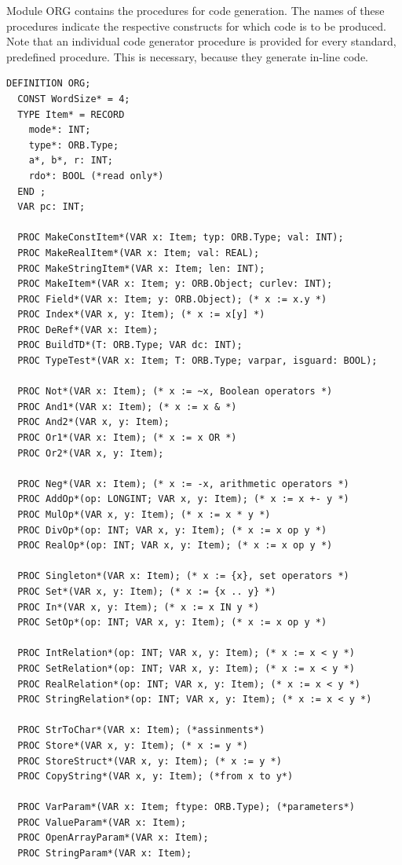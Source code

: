 Module ORG contains the procedures for code generation. The names of these procedures indicate
the respective constructs for which code is to be produced. Note that an individual code generator
procedure is provided for every standard, predefined procedure. This is necessary, because they
generate in-line code.
\begin{verbatim}
DEFINITION ORG;
  CONST WordSize* = 4;
  TYPE Item* = RECORD
    mode*: INT;
    type*: ORB.Type;
    a*, b*, r: INT;
    rdo*: BOOL (*read only*)
  END ;
  VAR pc: INT;

  PROC MakeConstItem*(VAR x: Item; typ: ORB.Type; val: INT);
  PROC MakeRealItem*(VAR x: Item; val: REAL);
  PROC MakeStringItem*(VAR x: Item; len: INT);
  PROC MakeItem*(VAR x: Item; y: ORB.Object; curlev: INT);
  PROC Field*(VAR x: Item; y: ORB.Object); (* x := x.y *)
  PROC Index*(VAR x, y: Item); (* x := x[y] *)
  PROC DeRef*(VAR x: Item);
  PROC BuildTD*(T: ORB.Type; VAR dc: INT);
  PROC TypeTest*(VAR x: Item; T: ORB.Type; varpar, isguard: BOOL);

  PROC Not*(VAR x: Item); (* x := ~x, Boolean operators *)
  PROC And1*(VAR x: Item); (* x := x & *)
  PROC And2*(VAR x, y: Item);
  PROC Or1*(VAR x: Item); (* x := x OR *)
  PROC Or2*(VAR x, y: Item);

  PROC Neg*(VAR x: Item); (* x := -x, arithmetic operators *)
  PROC AddOp*(op: LONGINT; VAR x, y: Item); (* x := x +- y *)
  PROC MulOp*(VAR x, y: Item); (* x := x * y *)
  PROC DivOp*(op: INT; VAR x, y: Item); (* x := x op y *)
  PROC RealOp*(op: INT; VAR x, y: Item); (* x := x op y *)

  PROC Singleton*(VAR x: Item); (* x := {x}, set operators *)
  PROC Set*(VAR x, y: Item); (* x := {x .. y} *)
  PROC In*(VAR x, y: Item); (* x := x IN y *)
  PROC SetOp*(op: INT; VAR x, y: Item); (* x := x op y *)

  PROC IntRelation*(op: INT; VAR x, y: Item); (* x := x < y *)
  PROC SetRelation*(op: INT; VAR x, y: Item); (* x := x < y *)
  PROC RealRelation*(op: INT; VAR x, y: Item); (* x := x < y *)
  PROC StringRelation*(op: INT; VAR x, y: Item); (* x := x < y *)

  PROC StrToChar*(VAR x: Item); (*assinments*)
  PROC Store*(VAR x, y: Item); (* x := y *)
  PROC StoreStruct*(VAR x, y: Item); (* x := y *)
  PROC CopyString*(VAR x, y: Item); (*from x to y*)

  PROC VarParam*(VAR x: Item; ftype: ORB.Type); (*parameters*)
  PROC ValueParam*(VAR x: Item);
  PROC OpenArrayParam*(VAR x: Item);
  PROC StringParam*(VAR x: Item);


\end{verbatim}
